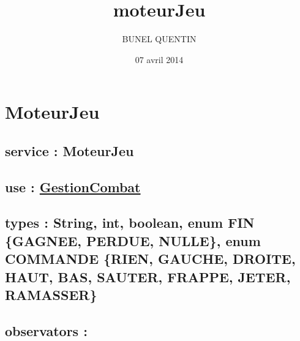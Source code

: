 \documentclass[11pt]{article}
\title{moteurJeu}
\author{BUNEL QUENTIN}
\date{07 avril 2014}
\begin{document}
\maketitle

\setcounter{tocdepth}{3}
\tableofcontents
\vspace*{1cm}
\section{MoteurJeu}
\label{sec-1}

\subsection{service : MoteurJeu}
\label{sec-1.1}

\subsection{use : \href{file:///users/Etu5/3000675/Desktop/spec/gestionCombat.org}{GestionCombat}}
\label{sec-1.2}

\subsection{types : String, int, boolean, enum FIN \{GAGNEE, PERDUE, NULLE\}, enum COMMANDE \{RIEN, GAUCHE, DROITE, HAUT, BAS, SAUTER, FRAPPE, JETER, RAMASSER\}}
\label{sec-1.3}

   
\subsection{observators :}
\label{sec-1.4}

\subsubsection{}
\end{document}
